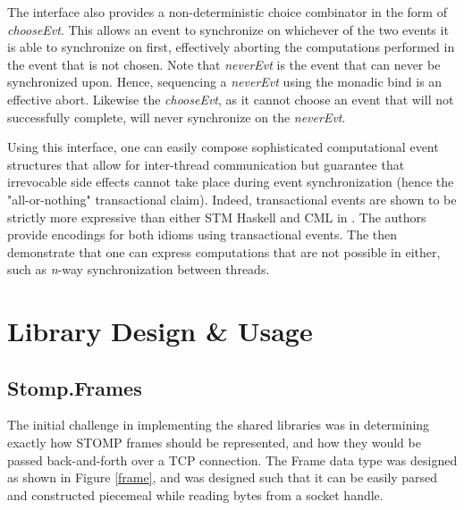 \documentclass[conference, letterpaper]{IEEEtran}
\begin{document}
The interface also provides a non-deterministic choice combinator in the form of \textit{chooseEvt}. This allows an event to synchronize on whichever of the two events it is able to synchronize on first, effectively aborting the computations performed in the event that is not chosen. Note that \textit{neverEvt} is the event that can never be synchronized upon. Hence, sequencing a \textit{neverEvt} using the monadic bind is an effective abort. Likewise the \textit{chooseEvt}, as it cannot choose an event that will not successfully complete, will never synchronize on the \textit{neverEvt}.

Using this interface, one can easily compose sophisticated computational event structures that allow for inter-thread communication but guarantee that irrevocable side effects cannot take place during event synchronization (hence the "all-or-nothing" transactional claim). Indeed, transactional events are shown to be strictly more expressive than either STM Haskell and CML in \cite{te:original}. The authors provide encodings for both idioms using transactional events. The then demonstrate that one can express computations that are not possible in either, such as \textit{n}-way synchronization between threads.



\section{Library Design \& Usage}

\subsection{Stomp.Frames}

The initial challenge in implementing the shared libraries was in determining exactly how STOMP frames should be represented, and how they would be passed back-and-forth over a TCP connection. The Frame data type was designed as shown in Figure \ref{frame}, and was designed such that it can be easily parsed and constructed piecemeal while reading bytes from a socket handle.
\end{document}
